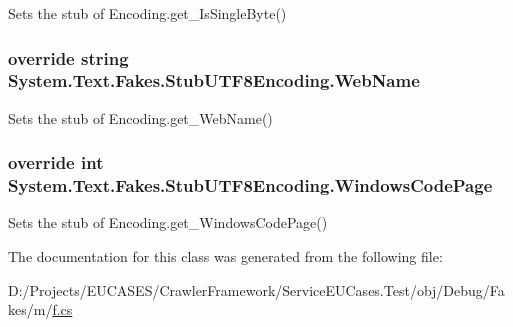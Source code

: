 Sets the stub of Encoding.\-get\-\_\-\-Is\-Single\-Byte()

\hypertarget{class_system_1_1_text_1_1_fakes_1_1_stub_u_t_f8_encoding_a6f8c4a50757942bc8a5ae63444a4a392}{
\subsubsection[{Web\-Name}]{\setlength{\rightskip}{0pt plus 5cm}override string System.\-Text.\-Fakes.\-Stub\-U\-T\-F8\-Encoding.\-Web\-Name\hspace{0.3cm}{\ttfamily [get]}}}\label{class_system_1_1_text_1_1_fakes_1_1_stub_u_t_f8_encoding_a6f8c4a50757942bc8a5ae63444a4a392}


Sets the stub of Encoding.\-get\-\_\-\-Web\-Name()

\hypertarget{class_system_1_1_text_1_1_fakes_1_1_stub_u_t_f8_encoding_a07e987ad911f8419bc3981336c20fab9}{
\subsubsection[{Windows\-Code\-Page}]{\setlength{\rightskip}{0pt plus 5cm}override int System.\-Text.\-Fakes.\-Stub\-U\-T\-F8\-Encoding.\-Windows\-Code\-Page\hspace{0.3cm}{\ttfamily [get]}}}\label{class_system_1_1_text_1_1_fakes_1_1_stub_u_t_f8_encoding_a07e987ad911f8419bc3981336c20fab9}


Sets the stub of Encoding.\-get\-\_\-\-Windows\-Code\-Page()



The documentation for this class was generated from the following file\-:\begin{DoxyCompactItemize}
\item 
D\-:/\-Projects/\-E\-U\-C\-A\-S\-E\-S/\-Crawler\-Framework/\-Service\-E\-U\-Cases.\-Test/obj/\-Debug/\-Fakes/m/\hyperlink{m_2f_8cs}{f.\-cs}\end{DoxyCompactItemize}
